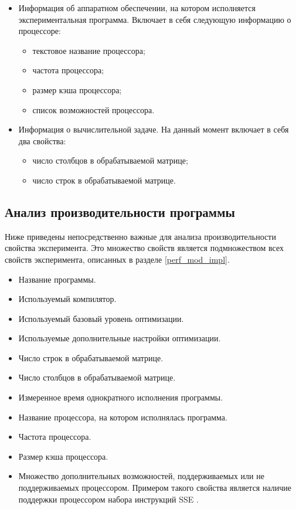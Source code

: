 \begin{itemize}
	\item Информация об аппаратном обеспечении, на котором исполняется экспериментальная программа. Включает в себя следующую информацию о процессоре:
	\begin{itemize}
		\item текстовое название процессора;
		\item частота процессора;
		\item размер кэша процессора;
		\item список возможностей процессора.
	\end{itemize}

	\item Информация о вычислительной задаче. На данный момент включает в себя два свойства:
	\begin{itemize}
		\item число столбцов в обрабатываемой матрице;
		\item число строк в обрабатываемой матрице.
	\end{itemize}
\end{itemize}

\subsection{Анализ производительности программы}

Ниже приведены непосредственно важные для анализа производительности свойства эксперимента. Это множество свойств является подмножеством всех свойств эксперимента, описанных в разделе \ref{perf_mod_impl}.

\begin{itemize}
	\item Название программы.
	\item Используемый компилятор.
	\item Используемый базовый уровень оптимизации.
	\item Используемые дополнительные настройки оптимизации.
	\item Число строк в обрабатываемой матрице.
	\item Число столбцов в обрабатываемой матрице.
	\item Измеренное время однократного исполнения программы.
	\item Название процессора, на котором исполнялась программа.
	\item Частота процессора.
	\item Размер кэша процессора.
	\item Множество дополнительных возможностей, поддерживаемых или не поддерживаемых процессором. Примером такого свойства является наличие поддержки процессором набора инструкций SSE \cite{sse}.
\end{itemize}


